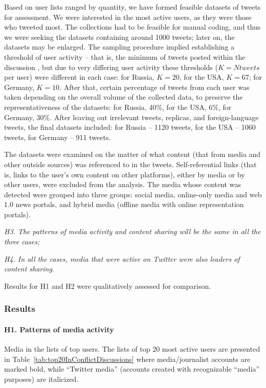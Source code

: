 Based on user lists ranged by quantity, we have formed feasible datasets of tweets for assessment. We were interested in the most active users, as they were those who tweeted most. The collections had to be feasible for manual coding, and thus we were seeking the datasets containing around 1000 tweets; later on, the datasets may be enlarged. The sampling procedure implied establishing a threshold of user activity – that is, the minimum of tweets posted within the discussion \cite{LevyWindahl,ChaHaddadiBenevenuto}, but due to very differing user activity these thresholds (\(K = \textit{Ntweets}\) per user) were different in each case: for Russia, \(K = 20\), for the USA, \(K = 67\); for Germany, \(K = 10\). After that, certain percentage of tweets from each user was taken depending on the overall volume of the collected data, to preserve the representativeness of the datasets: for Russia, 40\%, for the USA, 6\%, for Germany, 30\%. After leaving out irrelevant tweets, replicas, and foreign-language tweets, the final datasets included: for Russia -- 1120 tweets, for the USA -- 1060 tweets, for Germany -- 911 tweets.

The datasets were examined on the matter of what content (that from media and other outside sources) was referenced to in the tweets. Self-referential links (that is, links to the user’s own content on other platforms), either by media or by other users, were excluded from the analysis. The media whose content was detected were grouped into three groups: social media, online-only media and web 1.0 news portals, and hybrid media (offline media with online representation portals).

\textit{H3. The patterns of media activity and content sharing will be the same in all the three cases;}

\textit{H4. In all the cases, media that were active on Twitter were also leaders of content sharing.}

Results for H1 and H2 were qualitatively assessed for comparison.

\subsubsection{Results}

\paragraph{H1. Patterns of media activity}
Media in the lists of top users. The lists of top 20 most active users are presented in Table~\cref{tab:top20InConflictDiscussions} where media/journalist accounts are marked bold, while “Twitter media” (accounts created with recognizable “media” purposes) are italicized.

